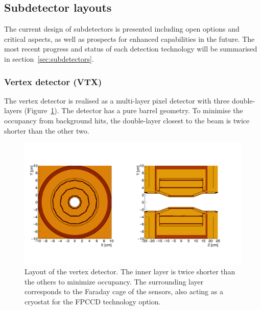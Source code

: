 

\subsection{Subdetector layouts}
\label{ref:subsec:subdetectors}

The current design of subdetectors is presented including open options and critical aspects, as well as prospects for enhanced capabilities in the future. The most recent progress and status of each detection technology will be summarised in section~\ref{sec:subdetectors}.

\subsubsection*{Vertex detector (VTX)}

The vertex detector is realised as a multi-layer pixel detector with three double-layers (Figure~\ref{fig:det:vertex}). The detector has a pure barrel geometry. To minimise the occupancy from background hits,
the double-layer closest to the beam is twice shorter than the other two. 

\begin{figure}[t!]
\centering
\includegraphics[width=0.9\hsize]{Detector/fig/vertex.png}
\caption{Layout of the vertex detector. The inner layer is twice shorter than the others to minimize occupancy. The surrounding layer corresponds to the Faraday cage of the sensors, also acting as a cryostat for the FPCCD technology option.}
\label{fig:det:vertex}
\end{figure}

